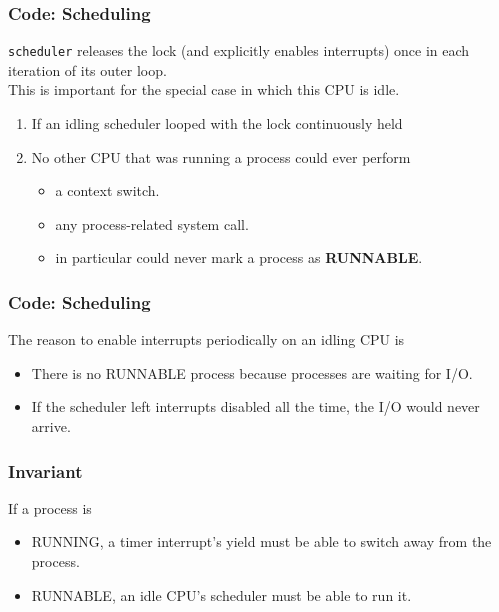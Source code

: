 \documentclass{beamer}
\begin{document}

\begin{frame}[t]
  \frametitle{Code: Scheduling}
  \texttt{scheduler} releases the lock (and explicitly enables interrupts) once in each iteration of its outer loop.\\
  This is important for the special case in which this CPU is idle.

  \begin{enumerate}
  \item If an idling scheduler looped with the lock continuously held
  \item No other CPU that was running a process could ever perform
    \begin{itemize}
    \item a context switch.
    \item any process-related system call.
    \item in particular could never mark a process as \textbf{RUNNABLE}.
    \end{itemize}
  \end{enumerate}
  
\end{frame}


\begin{frame}[t]
  \frametitle{Code: Scheduling}
  The reason to enable interrupts periodically on an idling CPU is

  \begin{itemize}
  \item There is no RUNNABLE process because processes are waiting for I/O.
  \item If the scheduler left interrupts disabled all the time, the I/O would never arrive.
  \end{itemize}
  
\end{frame}


\begin{frame}[t]
  \frametitle{Invariant}
  If a process is 
  \begin{itemize}
  \item RUNNING, a timer interrupt's yield must be able to switch away from the process.
  \item RUNNABLE, an idle CPU’s scheduler must be able to run it.
  \end{itemize}

\end{frame}
\end{document}

